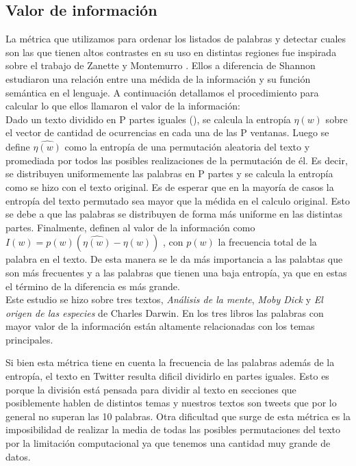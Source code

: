 \subsection{Valor de información}
La métrica que utilizamos para ordenar los listados de palabras y detectar cuales son
las que tienen altos contrastes en su uso en distintas regiones fue inspirada sobre el
trabajo de Zanette y Montemurro \cite{montemurro2010towards}.
Ellos a diferencia de Shannon estudiaron una relación entre una médida de la información y su función semántica en el lenguaje.
A continuación detallamos el procedimiento para calcular lo que ellos llamaron
el valor de la información: \\

Dado un texto dividido en P partes iguales (), se calcula la entropía  $\eta(w)$ sobre el vector de cantidad de ocurrencias en cada una de las P ventanas.
Luego se define $\widehat{\eta(w)}$  como la entropía de una permutación aleatoria del texto y promediada por todos las posibles realizaciones de la permutación de él. 
Es decir, se distribuyen uniformemente las palabras en P partes y se calcula la
entropía como se hizo con el texto original. Es de esperar que en la mayoría de casos 
la entropía del texto permutado sea mayor que la médida en el calculo original. Esto 
se debe a que las palabras se distribuyen de forma más uniforme 
en las distintas partes.
Finalmente, definen al valor de la información como $I(w) = p(w) (\widehat{\eta(w)} - \eta(w))$ , con $p(w)$ la frecuencia total de la palabra en el texto. 
De esta manera se le da más importancia a las palabtas que son más frecuentes y a las palabras que tienen una baja entropía, ya que en estas el término de la diferencia es más grande.\\

Este estudio se hizo sobre tres textos, \textit{Análisis de la mente}, 
\textit{Moby Dick} y \textit{El origen de las especies} de Charles Darwin. 
En los tres libros las palabras con mayor valor de la información están 
altamente relacionadas con los temas principales.

Si bien esta métrica tiene en cuenta la frecuencia de las palabras además de la 
entropía, el texto en Twitter resulta dificil dividirlo en partes iguales. 
Esto es porque la división está pensada para dividir al texto en secciones que 
posiblemente hablen de distintos temas y nuestros textos son tweets que por lo general no superan las 10 palabras.
Otra dificultad que surge de esta métrica es la imposibilidad de realizar la media 
de todas las posibles permutaciones del texto por la limitación computacional ya que 
tenemos una cantidad muy grande de datos.

